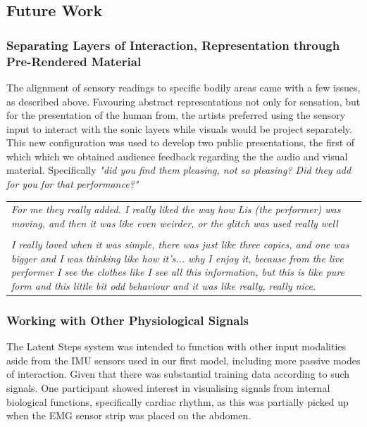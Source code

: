 \subsection{Future Work}

\subsubsection{Separating Layers of Interaction, Representation through Pre-Rendered Material}

The alignment of sensory readings to specific bodily areas came with a few issues, as described above. Favouring abstract representations not only for sensation, but for the presentation of the human from, the artists preferred using the sensory input to interact with the sonic layers while visuals would be project separately. This new configuration was used to develop two public presentations, the first of which which we obtained audience feedback regarding the the audio and visual material. Specifically \textit{"did you find them pleasing, not so pleasing? Did they add for you for that performance?"}

\begin{center}
\begin{tabular}{ p{13cm}} 
\textit{For me they really added. I really liked the way how Lis (the performer) was moving, and then it was like even weirder, or the glitch was used really well} \\
\\
\textit{I really loved when it was simple, there was just like three copies, and one was bigger and I was thinking like how it's... why I enjoy it, because from the live performer I see the clothes like I see all this information, but this is like pure form and this little bit odd behaviour and it was like really, really nice.}
\end{tabular}
\end{center}

\subsubsection{Working with Other Physiological Signals}

The Latent Steps system was intended to function with other input modalities aside from the IMU sensors used in our first model, including more passive modes of interaction. Given that there was substantial training data according to such signals. One participant showed interest in visualising signals from internal biological functions, specifically cardiac rhythm, as this was partially picked up when the EMG sensor strip was placed on the abdomen. 

